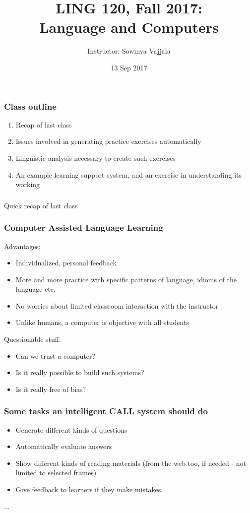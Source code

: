 \documentclass{beamer}
\author[Sowmya Vajjala]{Instructor: Sowmya Vajjala}
\title[LING 120]{LING 120, Fall 2017: \\ Language and Computers}
\date{13 Sep 2017}
\institute{Iowa State University, USA}
\begin{document}
\begin{frame}\titlepage
\end{frame}

\begin{frame}
\frametitle{Class outline}%
\begin{enumerate}
\item Recap of last class
\item Issues involved in generating practice exercises automatically
\item Linguistic analysis necessary to create such exercises
\item An example learning support system, and an exercise in understanding its working
\end{enumerate}
\end{frame}

\begin{frame}
\frametitle{}
\begin{center}
\Large Quick recap of last class
\end{center}
\end{frame}

\begin{frame}
\frametitle{Computer Assisted Language Learning}
Advantages: 
\begin{itemize}
\item Individualized, personal feedback
\item More and more practice with specific patterns of language, idioms of the language etc. 
\item No worries about limited classroom interaction with the instructor
\item Unlike humans, a computer is objective with all students
\end{itemize} \pause
Questionable stuff: 
\begin{itemize}
\item Can we trust a computer?
\item Is it really possible to build such systems?  
\item Is it really free of bias?
\end {itemize}
\end{frame}


\begin{frame}
\frametitle{Some tasks an intelligent CALL system should do}
\begin{itemize}
\item Generate different kinds of questions
\item Automatically evaluate answers
\item Show different kinds of reading materials (from the web too, if needed - not limited to selected frames)
\item Give feedback to learners if they make mistakes.
\end{itemize}
... 
\end{frame}
\end{document}

